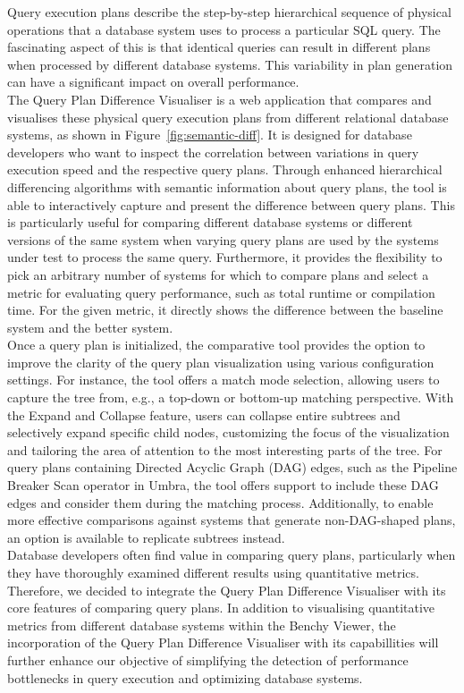 \noindent 
Query execution plans describe the step-by-step hierarchical sequence of physical operations that a database system uses to process a particular SQL query. The fascinating aspect of this is that identical queries can result in different plans when processed by different database systems. This variability in plan generation can have a significant impact on overall performance.
\\The Query Plan Difference Visualiser is a web application that compares and visualises these physical query execution plans from different relational database systems, as shown in Figure~\ref{fig:semantic-diff}. It is designed for database developers who want to inspect the correlation between variations in query execution speed and the respective query plans. Through enhanced hierarchical differencing algorithms with semantic information about query plans, the tool is able to interactively capture and present  the difference between query plans. This is particularly useful for comparing different database systems or different versions of the same system when varying query plans are used by the systems under test to process the same query. Furthermore, it provides the flexibility to pick an arbitrary number of systems for which to compare plans and select a metric for evaluating query performance, such as total runtime or compilation time. For the given metric, it directly shows the difference between the baseline system and the better system.
\\ Once a query plan is initialized, the comparative tool provides the option to improve the clarity of the query plan visualization using various configuration settings. For instance, the tool offers a match mode selection, allowing users to capture the tree from, e.g., a top-down or bottom-up matching perspective. With the Expand and Collapse feature, users can collapse entire subtrees and selectively expand specific child nodes, customizing the focus of the visualization and tailoring the area of attention to the most interesting parts of the tree.
For query plans containing Directed Acyclic Graph (DAG) edges, such as the Pipeline Breaker Scan operator in Umbra, the tool offers support to include these DAG edges and consider them during the matching process. Additionally, to enable more effective comparisons against systems that generate non-DAG-shaped plans, an option is available to replicate subtrees instead.
\\ Database developers often find value in comparing query plans, particularly when they have thoroughly examined different results using quantitative metrics. 
Therefore, we decided to integrate the Query Plan Difference Visualiser with its core features of comparing query plans. In addition to visualising quantitative metrics from different database systems within the Benchy Viewer, the incorporation of the Query Plan Difference Visualiser with its capabillities will further enhance our objective of simplifying the detection of performance bottlenecks in query execution and optimizing database systems.

